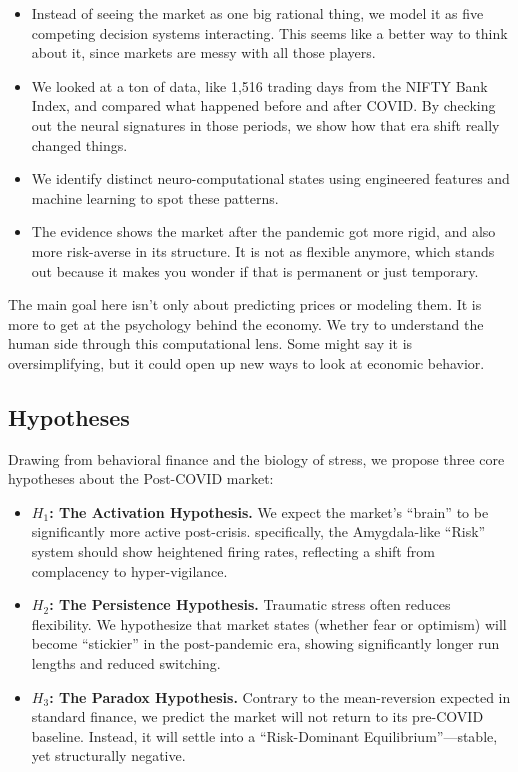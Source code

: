 \documentclass[conference]{IEEEtran}
\begin{document}
\begin{itemize}
    \item Instead of seeing the market as one big rational thing, we model it as five competing decision systems interacting. This seems like a better way to think about it, since markets are messy with all those players.
    \item We looked at a ton of data, like 1,516 trading days from the NIFTY Bank Index, and compared what happened before and after COVID. By checking out the neural signatures in those periods, we show how that era shift really changed things.
    \item We identify distinct neuro-computational states using engineered features and machine learning to spot these patterns.
    \item The evidence shows the market after the pandemic got more rigid, and also more risk-averse in its structure. It is not as flexible anymore, which stands out because it makes you wonder if that is permanent or just temporary.
\end{itemize}

The main goal here isn't only about predicting prices or modeling them. It is more to get at the psychology behind the economy. We try to understand the human side through this computational lens. Some might say it is oversimplifying, but it could open up new ways to look at economic behavior.

\subsection{Hypotheses}
Drawing from behavioral finance and the biology of stress, we propose three core hypotheses about the Post-COVID market:

\begin{itemize}
    \item \textbf{$H_1$: The Activation Hypothesis.} We expect the market's ``brain'' to be significantly more active post-crisis. specifically, the Amygdala-like ``Risk'' system should show heightened firing rates, reflecting a shift from complacency to hyper-vigilance.
    
    \item \textbf{$H_2$: The Persistence Hypothesis.} Traumatic stress often reduces flexibility. We hypothesize that market states (whether fear or optimism) will become ``stickier'' in the post-pandemic era, showing significantly longer run lengths and reduced switching.
    
    \item \textbf{$H_3$: The Paradox Hypothesis.} Contrary to the mean-reversion expected in standard finance, we predict the market will not return to its pre-COVID baseline. Instead, it will settle into a ``Risk-Dominant Equilibrium''---stable, yet structurally negative.
\end{itemize}
\end{document}
